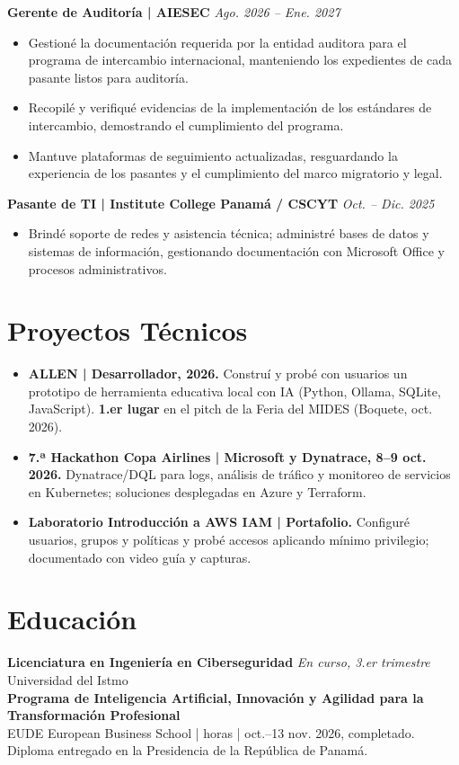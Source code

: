 \documentclass[10pt,a4paper]{article}
\begin{document}
\textbf{Gerente de Auditoría \;|\; AIESEC} \hfill \textit{Ago. 2026 -- Ene. 2027}
\begin{itemize}
  \item Gestioné la documentación requerida por la entidad auditora para el programa de intercambio internacional, manteniendo los expedientes de cada pasante listos para auditoría.
  \item Recopilé y verifiqué evidencias de la implementación de los estándares de intercambio, demostrando el cumplimiento del programa.
  \item Mantuve plataformas de seguimiento actualizadas, resguardando la experiencia de los pasantes y el cumplimiento del marco migratorio y legal.
\end{itemize}

\textbf{Pasante de TI \;|\; Institute College Panamá / CSCYT} \hfill \textit{Oct. -- Dic. 2025}
\begin{itemize}
  \item Brindé soporte de redes y asistencia técnica; administré bases de datos y sistemas de información, gestionando documentación con Microsoft Office y procesos administrativos.
\end{itemize}

\section*{Proyectos Técnicos}
\begin{itemize}
  \item \textbf{ALLEN \;|\; Desarrollador, 2026.} Construí y probé con usuarios un prototipo de herramienta educativa local con IA (Python, Ollama, SQLite, JavaScript). \textbf{1.er lugar} en el pitch de la Feria del MIDES (Boquete, oct. 2026).
  \item \textbf{7.ª Hackathon Copa Airlines \;|\; Microsoft y Dynatrace, 8--9 oct. 2026.} Dynatrace/DQL para logs, análisis de tráfico y monitoreo de servicios en Kubernetes; soluciones desplegadas en Azure y Terraform.
  \item \textbf{Laboratorio Introducción a AWS IAM \;|\; Portafolio.} Configuré usuarios, grupos y políticas y probé accesos aplicando mínimo privilegio; documentado con video guía y capturas.
\end{itemize}

\section*{Educación}
\textbf{Licenciatura en Ingeniería en Ciberseguridad} \hfill \textit{En curso, 3.er trimestre}\\
Universidad del Istmo\\[2pt]
\textbf{Programa de Inteligencia Artificial, Innovación y Agilidad para la Transformación Profesional}\\
EUDE European Business School \;| horas \;| oct.--13 nov. 2026, completado. Diploma entregado en la Presidencia de la República de Panamá.
\end{document}
